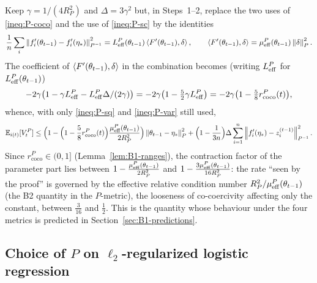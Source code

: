 \begin{remark}\label{rem:B1-effective-rate}
Keep $\gamma=1/(4R_P^2)$ and $\Delta=3\gamma^2$ but, in Steps~1--2, replace the two uses of
\eqref{ineq:P-coco} and the use of \eqref{ineq:P-sc} by the identities
\[
\frac1n\sum_i\left\|f'_i(\theta_{t-1})-f'_i(\eta_\ast)\right\|_{P^{-1}}^2=L_{\mathrm{eff}}^P(\theta_{t-1})\left\langle F'(\theta_{t-1}), \delta \right\rangle,
\qquad
\left\langle F'(\theta_{t-1}), \delta \right\rangle=\mu_{\mathrm{eff}}^P(\theta_{t-1})\left\|\delta\right\|_P^2 .
\]
The coefficient of $\left\langle F'(\theta_{t-1}), \delta \right\rangle$ in the combination becomes (writing $L_{\mathrm{eff}}^P$ for
$L_{\mathrm{eff}}^P(\theta_{t-1})$)
\[
-2\gamma\big(1-\gamma L_{\mathrm{eff}}^P-L_{\mathrm{eff}}^P\Delta/(2\gamma)\big)=-2\gamma\big(1-\tfrac52\gamma L_{\mathrm{eff}}^P\big)
=-2\gamma\big(1-\tfrac58r^P_{\mathrm{coco}}(t)\big),
\]
whence, with only \eqref{ineq:P-sq} and \eqref{ineq:P-var} still used,
\begin{equation}\label{eq:B1-effective-rate}
\mathbb{E}_{i(t)}[V_t^P]\le\Big(1-\Big(1-\frac58r^P_{\mathrm{coco}}(t)\Big)\frac{\mu_{\mathrm{eff}}^P(\theta_{t-1})}{2R_P^2}\Big)
\left\|\theta_{t-1}-\eta_\ast\right\|_P^2
+\Big(1-\frac1{3n}\Big)\Delta\sum_{i=1}^n\left\|f'_i(\eta_\ast)-z_i^{(t-1)}\right\|_{P^{-1}}^2 .
\end{equation}
Since $r^P_{\mathrm{coco}}\in(0,1]$ (Lemma~\ref{lem:B1-ranges}), the contraction factor of the parameter
part lies between $1-\frac{\mu_{\mathrm{eff}}^P(\theta_{t-1})}{2R_P^2}$ and $1-\frac{3\mu_{\mathrm{eff}}^P(\theta_{t-1})}{16R_P^2}$:
the rate ``seen by the proof'' is governed by the effective relative condition number
$R_P^2/\mu_{\mathrm{eff}}^P(\theta_{t-1})$ (the B2 quantity in the
$P$-metric), the looseness of co-coercivity affecting only the constant, between $\frac3{16}$ and
$\frac12$. This is the quantity whose behaviour under the four metrics is predicted in
Section~\ref{sec:B1-predictions}.
\end{remark}

\subsection{Choice of \texorpdfstring{$P$}{P} on \texorpdfstring{$\ell_2$}{l2}-regularized logistic regression}
\label{sec:B1-choice}

